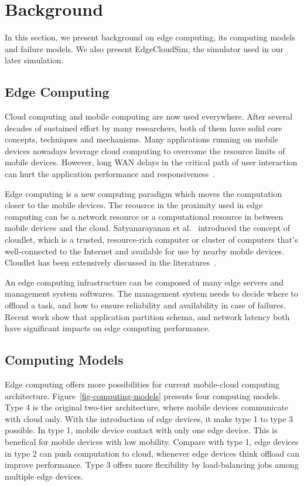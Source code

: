 \section{Background}
\label{sec:background}

In this section, we present background on edge computing, its computing models and failure models.
We also present EdgeCloudSim, the simulator used in our later simulation.

\subsection{Edge Computing}
Cloud computing and mobile computing are now used everywhere.
After several decades of sustained effort by many researchers, both of them have
solid core concepts, techniques and mechanisms. Many applications running on mobile devices nowadays
leverage cloud computing to overcome the resource limits of mobile devices. However,
long WAN delays in the critical path of user interaction can hurt the application
performance and responsiveness~\cite{cloudlets09}.




Edge computing is a new computing paradigm which moves the computation closer to the mobile devices.
The reousrce in the proximity used in edge computing can be a network resource or a computational resource
in between mobile devices and the cloud. Satyanarayanan et al.~\cite{cloudlets09} introduced the concept
of cloudlet, which is a trusted, resource-rich computer or cluster of computers that's well-connected to
the Internet and available for use by nearby mobile devices. Cloudlet has been extensively discussed in the
literatures~\cite{edge-computing, Cloudlets12,hu-apsys16,ChaufournierSLN17}.

An edge computing infrastructure can be composed of many edge servers and management system softwares.
The management system needs to decide where to offload a task, and how to ensure reliability and availability
in case of failures. Recent work \cite{hu-apsys16,COMET} show that application partition schema, and network latency
both have significant impacts on edge computing performance.

\subsection{Computing Models}
\label{sec:computing-models}
Edge computing offers more possibilities for current mobile-cloud computing architecture.
Figure~\ref{fig-computing-models} presents four computing models. Type 4 is the original
two-tier architecture, where mobile devices communicate with cloud only. With the introduction of
edge devices, it make type 1 to type 3 possible. In type 1, mobile device contact with only one edge device.
This is benefical for mobile devices with low mobility. Compare with type 1, edge devices in type 2 can
push computation to cloud, whenever edge devices think offload can improve performance. Type 3 offers
more flexibility by load-balancing jobs among multiple edge devices.

